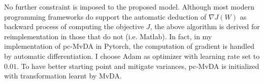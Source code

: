         No further constraint is imposed to the proposed model. Although most modern programming frameworks do support the automatic deduction of $\nabla J\left(W\right)$ as backward process of computing the objective $J$, the above algorithm is derived for reimplementation in those that do not (i.e. Matlab). In fact, in my implementation of pc-MvDA in Pytorch, the computation of gradient is handled by automatic differentiation. I choose Adam as optimizer with learning rate set to $0.01$. To have better starting point and mitigate variances, pc-MvDA is initialized with transformation learnt by MvDA.
